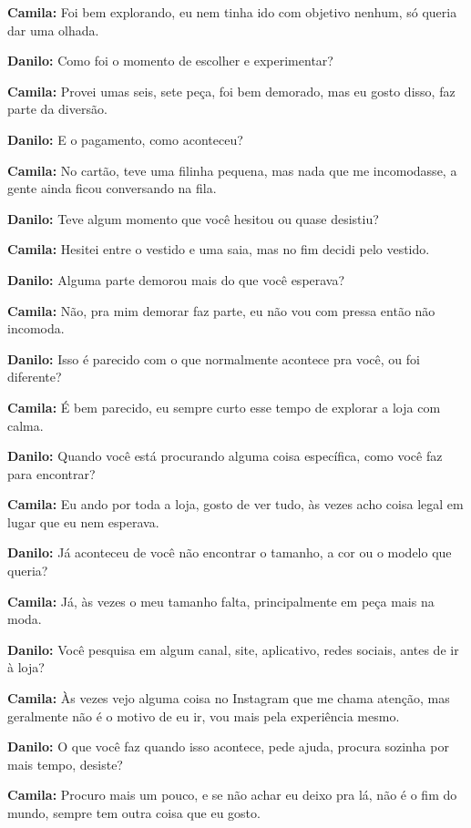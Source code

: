 \textbf{Camila:} Foi bem explorando, eu nem tinha ido com objetivo nenhum, só queria dar uma olhada.

\textbf{Danilo:} Como foi o momento de escolher e experimentar?

\textbf{Camila:} Provei umas seis, sete peça, foi bem demorado, mas eu gosto disso, faz parte da diversão.

\textbf{Danilo:} E o pagamento, como aconteceu?

\textbf{Camila:} No cartão, teve uma filinha pequena, mas nada que me incomodasse, a gente ainda ficou conversando na fila.

\textbf{Danilo:} Teve algum momento que você hesitou ou quase desistiu?

\textbf{Camila:} Hesitei entre o vestido e uma saia, mas no fim decidi pelo vestido.

\textbf{Danilo:} Alguma parte demorou mais do que você esperava?

\textbf{Camila:} Não, pra mim demorar faz parte, eu não vou com pressa então não incomoda.

\textbf{Danilo:} Isso é parecido com o que normalmente acontece pra você, ou foi diferente?

\textbf{Camila:} É bem parecido, eu sempre curto esse tempo de explorar a loja com calma.

\textbf{Danilo:} Quando você está procurando alguma coisa específica, como você faz para encontrar?

\textbf{Camila:} Eu ando por toda a loja, gosto de ver tudo, às vezes acho coisa legal em lugar que eu nem esperava.

\textbf{Danilo:} Já aconteceu de você não encontrar o tamanho, a cor ou o modelo que queria?

\textbf{Camila:} Já, às vezes o meu tamanho falta, principalmente em peça mais na moda.

\textbf{Danilo:} Você pesquisa em algum canal, site, aplicativo, redes sociais, antes de ir à loja?

\textbf{Camila:} Às vezes vejo alguma coisa no Instagram que me chama atenção, mas geralmente não é o motivo de eu ir, vou mais pela experiência mesmo.

\textbf{Danilo:} O que você faz quando isso acontece, pede ajuda, procura sozinha por mais tempo, desiste?

\textbf{Camila:} Procuro mais um pouco, e se não achar eu deixo pra lá, não é o fim do mundo, sempre tem outra coisa que eu gosto.


